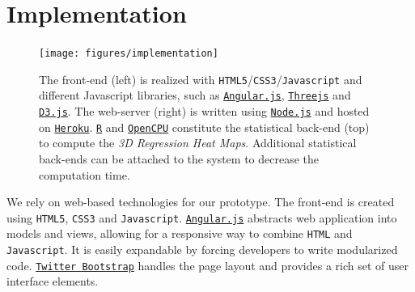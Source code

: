 \documentclass[journal]{style/vgtc} 			          %
\begin{document}
\section{Implementation} \label{implementation}
\begin{figure}[htb]
 \centering
 \texttt{[image: figures/implementation]}
 \caption{
 The front-end (left) is realized with \texttt{HTML5}/\texttt{CSS3}/\texttt{Javascript} and different Javascript libraries, such as \href{https://www.angularjs.org/}{\texttt{Angular.js}}, \href{http://threejs.org}{\texttt{Threejs}} and \href{http://d3js.org/}{\texttt{D3.js}}.
 The web-server (right) is written using \href{http://nodejs.org}{\texttt{Node.js}} and hosted on \href{https://www.heroku.com/}{\texttt{Heroku}}.
 \href{http://r-project.org}{\texttt{R}} and \href{https://www.opencpu.org/}{\texttt{OpenCPU}} constitute the statistical back-end (top) to compute the \emph{3D Regression Heat Maps}.
 Additional statistical back-ends can be attached to the system to decrease the computation time.
 }
  \label{fig:Implementation}
\end{figure}
\noindent We rely on web-based technologies for our prototype.
The front-end is created using \texttt{HTML5}, \texttt{CSS3} and \texttt{Javascript}.
\href{https://www.angularjs.org/}{\texttt{Angular.js}} abstracts web application into models and views, allowing for a responsive way to combine \texttt{HTML} and \texttt{Javascript}.
It is easily expandable by forcing developers to write modularized code.
\href{http://getbootstrap.com}{\texttt{Twitter Bootstrap}} handles the page layout and provides a rich set of user interface elements.
\end{document}
